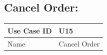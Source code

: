 \documentclass[12pt]{article}
\begin{document}
\subsection{Cancel Order:}

\begin{table}[H]
\begin{tabular}{|l|l|}
\hline
Use Case ID & U15                                                                                                                                                                                                                                                                                                                                                                                                                                                                                                                                                                                                                                                                                                                                                                                                                                                                                                                                                                                                                                                                                                                                                                                                                                                                                                                                            \\ \hline
Name        & Cancel Order                                                                                                                                                                                                                                                                                                                                                                                                                                                                                                                                                                                                                                                                                                                                                                                                                                                                                                                                                                                                                                                                                                                                                                                                                                                                                                                                   \\ \hline

\end{tabular}
\end{table}
\end{document}
